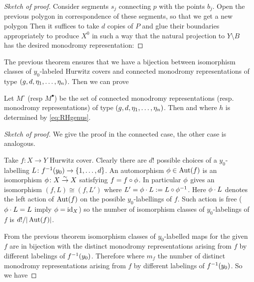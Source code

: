\documentclass[../main/main.tex]{subfiles}
\begin{document}
\begin{proof}[Sketch of proof]
	Consider segments $s_j$ connecting $p$ with the points $b_j$. Open the previous polygon in correspondence of these segments, so that we get a new polygon
	Then it suffices to take $d$ copies of $P$ and glue their boundaries appropriately to produce $X^0$ in such a way that the natural projection to $Y\setminus B$ has the desired monodromy representation:
\end{proof}

The previous theorem ensures that we have a bijection between isomorphism classes of $y_0$-labeled Hurwitz covers and connected monodromy representations of type $(g,d,\eta_1,\ldots,\eta_n)$. Then we can prove

\begin{theorem}\label{thm:CM7.3.1}
	Let $M^\circ$ (resp $M^\bullet$) be the set of connected monodromy representations (resp. monodromy representations) of type $(g,d,\eta_1,\ldots,\eta_n)$. Then
	and
	where $h$ is determined by \eqref{eq:RHgenus}. 
\end{theorem}

\begin{proof}[Sketch of proof]
	We give the proof in the connected case, the other case is analogous. 
	
	Take $f\colon X\to Y$ Hurwitz cover. Clearly there are $d!$ possible choices of a $y_0$-labelling $L\colon f^{-1}(y_0)\to \{1,\ldots,d\}$. An automorphism $\phi\in\operatorname{Aut}(f)$ is an isomorphism $\phi\colon X\overset\sim\to X$ satisfying $f=f\circ\phi$. In particular $\phi$ gives an isomorphism $(f,L)\cong(f,L')$ where $L'=\phi\cdot L:=L\circ\phi^{-1}$. Here $\phi\cdot L$ denotes the left action of $\operatorname{Aut}(f)$ on the possible $y_0$-labellings of $f$. Such action is free (\ie $\phi\cdot L=L$ imply $\phi=\textrm{id}_X$) so the number of isomorphism classes of $y_0$-labelings of $f$ is $d!/|\operatorname{Aut}(f)|$. 
	
	From the previous theorem isomorphism classes of $y_0$-labelled maps for the given $f$ are in bijection with the distinct monodromy representations arising from $f$ by different labelings of $f^{-1}(y_0)$. Therefore 
	where $m_f$ the number of distinct monodromy representations arising from $f$ by different labelings of $f^{-1}(y_0)$. So we have
\end{proof}
\end{document}
